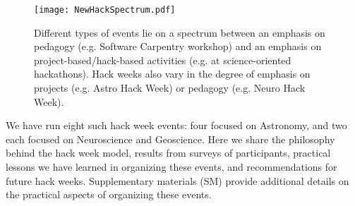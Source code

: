 \begin{figure}[h!]
\begin{center}
\texttt{[image: NewHackSpectrum.pdf]}
\caption{Different types of events lie on a spectrum between an emphasis on pedagogy (e.g. Software Carpentry workshop) and an emphasis on project-based/hack-based activities (e.g. at science-oriented hackathons). Hack weeks also vary in the degree of emphasis on projects (e.g. Astro Hack Week) or pedagogy (e.g. Neuro Hack Week).}
\label{fig:hackspectrum}
\end{center}
\end{figure}

We have run eight such hack week events: four focused on Astronomy, and two each focused on Neuroscience and Geoscience.
Here we share the philosophy behind the hack week model, results from surveys of participants, practical lessons we have learned in organizing these events, and recommendations for future hack weeks. Supplementary materials (SM) provide additional details on the practical aspects of organizing these events.
